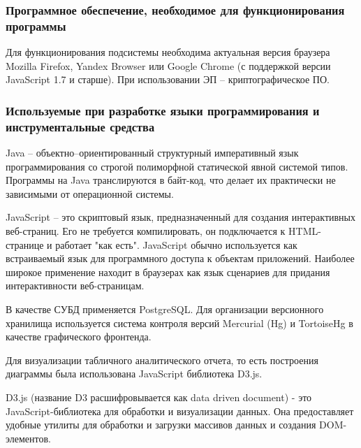 \documentclass[a4paper]{extarticle}
\begin{document}
\subsubsection{Программное обеспечение, необходимое для функционирования программы}
Для функционирования подсистемы необходима актуальная версия браузера Mozilla Firefox, Yandex Browser или Google Chrome (с поддержкой версии JavaScript 1.7 и старше). При использовании ЭП – криптографическое ПО.

\subsubsection{Используемые при разработке языки программирования и инструментальные средства}
Java – объектно–ориентированный структурный императивный язык программирования со строгой полиморфной статической явной системой типов. Программы на Java транслируются в байт-код, что делает их практически не зависимыми от операционной системы.\par
JavaScript – это скриптовый язык, предназначенный для создания интерактивных веб-страниц. Его не требуется компилировать, он подключается к HTML-странице и работает "как есть". JavaScript обычно используется как встраиваемый язык для программного доступа к объектам приложений. Наиболее широкое применение находит в браузерах как язык сценариев для придания интерактивности веб-страницам.\par
В качестве СУБД применяется PostgreSQL. Для организации версионного хранилища используется система контроля версий Mercurial (Hg) и TortoiseHg в качестве графического фронтенда.\par
Для визуализации табличного аналитического отчета, то есть построения диаграммы была использована JavaScript библиотека D3.js.\par
D3.js (название D3 расшифровывается как data driven document) - это JavaScript-библиотека для обработки и визуализации данных. Она предоставляет удобные утилиты для обработки и загрузки массивов данных и создания DOM-элементов.
\end{document}
